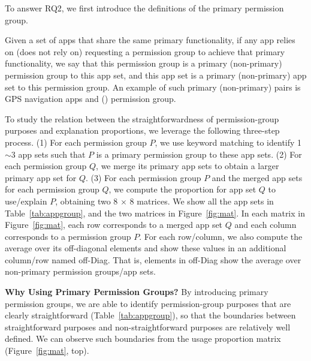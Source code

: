 To answer RQ2, we first introduce the definitions of the primary permission group. 

\begin{mydef}
Given a set of apps that share the same primary functionality, if any app relies on (does not rely on) requesting a permission group to achieve that primary functionality, we say that this permission group is a primary (non-primary) permission group to this app set, and this app set is a primary (non-primary) app set to this permission group. An example of such primary (non-primary) pairs is GPS navigation apps and  () permission group. 
\end{mydef}

To study the relation between the straightforwardness of permission-group purposes and explanation proportions, we leverage the following three-step process. (1) For each permission group $P$, we use keyword matching to identify 1$\sim$3 app sets such that $P$ is a primary permission group to these app sets. (2) For each permission group $Q$, we merge its primary app sets to obtain a larger primary app set for $Q$. (3) For each permission group $P$ and the merged app sets for each permission group $Q$, we compute the proportion for app set $Q$ to use/explain $P$, obtaining two 8 $\times$ 8 matrices. We show all the app sets in Table~\ref{tab:appgroup}, and the two matrices in Figure~\ref{fig:mat}. In each matrix in Figure~\ref{fig:mat}, each row corresponds to a merged app set $Q$ and each column corresponds to a permission group $P$. For each row/column, we also compute the average over its off-diagonal elements and show these values in an additional column/row named \textsf{off-Diag}. That is, elements in \textsf{off-Diag} show the average over non-primary permission groups/app sets.

{\bf Why Using Primary Permission Groups?} By introducing primary permission groups, we are able to identify permission-group purposes that are clearly straightforward (Table~\ref{tab:appgroup}), so that the boundaries between straightforward purposes and non-straightforward purposes are relatively well defined. We can observe such boundaries from the usage proportion matrix (Figure~\ref{fig:mat}, top).  

